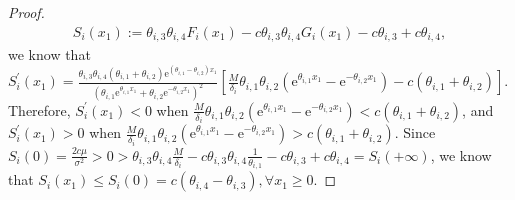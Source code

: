 \documentclass[11pt,reqno]{article}%
\numberwithin{equation}{section}
\begin{document}
\begin{proof}
\begin{equation}\begin{aligned}\nonumber
S_i(x_1):=\theta_{i,3}\theta_{i,4}F_i(x_1)-c\theta_{i,3}\theta_{i,4}G_i(x_1)-c\theta_{i,3}+c\theta_{i,4},
\end{aligned}\end{equation}
we know that $S_i^{\prime}(x_1)=\frac{\theta_{i,3}\theta_{i,4}(\theta_{i,1}+\theta_{i,2})\mathrm{e}^{(\theta_{i,1}-\theta_{i,2})x_1}}{\left(\theta_{i,1}\mathrm{e}^{\theta_{i,1}x
_1}+\theta_{i,2}\mathrm{e}^{-\theta_{i,2}x_1}\right)^2}\left[\frac{M}{\delta_i}\theta_{i,1}\theta_{i,2}\left(\mathrm{e}^{\theta_{i,1}x_1}-\mathrm{e}^{-\theta_{i,2}x_1}\right)-c(\theta_{i,1}+\theta_{i,2})\right]$. Therefore, $S_i^{\prime}(x_1)<0$ when $\frac{M}{\delta_i}\theta_{i,1}\theta_{i,2}\left(\mathrm{e}^{\theta_{i,1}x_1}-\mathrm{e}^{-\theta_{i,2}x_1}\right)<c(\theta_{i,1}+\theta_{i,2})$, and $S_i^{\prime}(x_1)>0$ when $\frac{M}{\delta_i}\theta_{i,1}\theta_{i,2}\left(\mathrm{e}^{\theta_{i,1}x_1}-\mathrm{e}^{-\theta_{i,2}x_1}\right)>c(\theta_{i,1}+\theta_{i,2})$. Since $S_i(0)=\frac{2c\mu}{\sigma^2}>0>\theta_{i,3}\theta_{i,4}\frac{M}{\delta_i}-c\theta_{i,3}\theta_{i,4}\frac{1}{\theta_{i,1}}-c\theta_{i,3}+c\theta_{i,4}=S_i(+\infty)$, we know that $S_i(x_1)\le S_i(0)=c(\theta_{i,4}-\theta_{i,3}), \forall x_1\ge0$.


\end{proof}
\end{document}
